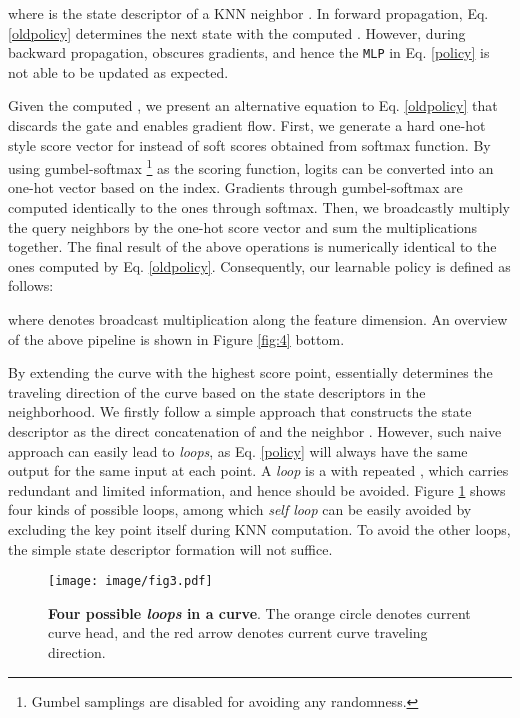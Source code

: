 \documentclass[10pt,twocolumn,letterpaper]{article}
\theoremstyle{definition}
\begin{document}
\noindent
where  is the state descriptor of a KNN neighbor . In forward propagation, Eq. \ref{oldpolicy} determines the next state with the computed . However, during backward propagation,  obscures gradients, and hence the \texttt{MLP} in Eq. \ref{policy} is not able to be updated as expected.

Given the computed , we present an alternative equation to Eq. \ref{oldpolicy} that discards the  gate and enables gradient flow. First, we generate a hard one-hot style score vector for  instead of soft scores obtained from softmax function. By using gumbel-softmax \cite{jang2016categorical, maddison2016concrete, yang2019modeling} \footnote{Gumbel samplings are disabled for avoiding any randomness.} as the scoring function, logits can be converted into an one-hot vector based on the  index. Gradients through gumbel-softmax are computed identically to the ones through softmax. Then, we broadcastly multiply the query neighbors by the one-hot score vector and sum the multiplications together. The final result of the above operations is numerically identical to the ones computed by Eq. \ref{oldpolicy}. Consequently, our learnable policy is defined as follows:

where  denotes broadcast multiplication along the feature dimension. An overview of the above pipeline is shown in Figure \ref{fig:4} bottom.



By extending the curve with the highest score point,  essentially determines the traveling direction of the curve based on the state descriptors in the neighborhood. We firstly follow a simple approach that constructs the state descriptor  as the direct concatenation of  and the neighbor . However, such naive approach can easily lead to \textit{loops}, as Eq. \ref{policy} will always have the same output for the same input at each point. A \textit{loop} is a  with repeated , which carries redundant and limited information, and hence should be avoided. Figure \ref{fig:3} shows four kinds of possible loops, among which \textit{self loop} can be easily avoided by excluding the key point itself during KNN computation. To avoid the other loops, the simple state descriptor formation will not suffice.

\begin{figure}[t]
	\begin{center}
\texttt{[image: image/fig3.pdf]}
	\end{center}
	\caption{\textbf{Four possible \textit{loops} in a curve}. The orange circle denotes current curve head, and the red arrow denotes current curve traveling direction.}
	\label{fig:3}
\end{figure}
\end{document}
